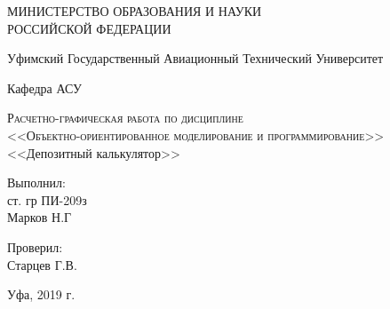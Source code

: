 
\begin{titlepage}
	\begin{center}
		\large
		МИНИСТЕРСТВО ОБРАЗОВАНИЯ И НАУКИ\\ РОССИЙСКОЙ ФЕДЕРАЦИИ
		
		\vspace{0.5cm}
		
		\large
		Уфимский Государственный Авиационный Технический Университет
		\vspace{0.25cm}
		
		\hfill
		Кафедра АСУ
		\vfill
		
		\textsc{Расчетно-графическая работа по дисциплине\\
		<<Объектно-ориентированное моделирование и программирование>>}\\[5mm]
		
		
		{\LARGE <<Депозитный калькулятор>>}
		\bigskip
	\end{center}
	\vfill
\begin{flushright}
Выполнил:\\ст. гр ПИ-209з\\Марков Н.Г
\end{flushright}
\bigskip
\begin{flushright}
Проверил:\\Старцев Г.В.
\end{flushright}
\bigskip
	\begin{center}
		Уфа, 2019 г.
	\end{center}
\end{titlepage}